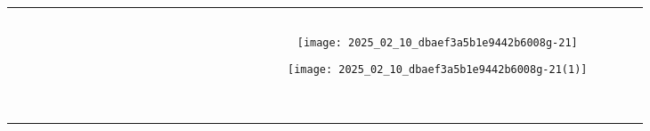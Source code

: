 \documentclass[10pt]{article}
\begin{document}
\begin{center}
\begin{tabular}{|c|c|c|c|c|c|c|c|c|c|c|c|c|c|c|c|c|c|c|c|c|c|c|c|c|c|c|}
\hline
 &  &  &  &  &  &  &  &  &  &  &  &  &  &  &  &  &  &  &  &  &  &  &  &  &  &  \\
\hline
 &  &  &  &  &  &  &  &  &  &  &  &  &  &  &  &  &  &  &  &  &  &  &  &  &  &  \\
\hline
 &  &  &  &  &  &  &  &  &  &  &  &  &  &  &  &  &  &  &  &  &  &  &  &  &  &  \\
\hline
 &  &  &  &  &  &  &  &  &  &  &  &  &  &  &  &  &  &  &  &  &  &  &  &  &  &  \\
\hline
 &  &  &  &  &  &  &  &  &  &  &  &  &  &  &  &  &  &  &  &  &  &  &  &  &  &  \\
\hline
 &  &  &  &  &  &  &  &  &  &  &  &  &  &  &  &  &  &  &  &  &  &  &  &  &  &  \\
\hline
 &  &  &  &  &  &  &  &  &  &  &  &  &  &  &  &  &  &  &  &  &  & \texttt{[image: 2025\_02\_10\_dbaef3a5b1e9442b6008g-21]}
 &  &  &  &  \\
\hline
 &  &  &  &  &  &  &  &  &  &  &  &  &  &  &  &  &  &  &  &  &  &  &  &  &  &  \\
\hline
 &  &  &  &  &  &  &  &  &  &  &  &  &  &  &  &  &  &  &  &  &  & \texttt{[image: 2025\_02\_10\_dbaef3a5b1e9442b6008g-21(1)]}
 &  &  &  &  \\
\hline
 &  &  &  &  &  &  &  &  &  &  &  &  &  &  &  &  &  &  &  &  &  &  &  &  &  &  \\
\hline
 &  &  &  &  &  &  &  &  &  &  &  &  &  &  &  &  &  &  &  &  &  &  &  &  &  &  \\
\hline
 &  &  &  &  &  &  &  &  &  &  &  &  &  &  &  &  &  &  &  &  &  &  &  &  &  &  \\
\hline
 &  &  &  &  &  &  &  &  &  &  &  &  &  &  &  &  &  &  &  &  &  &  &  &  &  &  \\
\hline
 &  &  &  &  &  &  &  &  &  &  &  &  &  &  &  &  &  &  &  &  &  &  &  &  &  &  \\
\hline
 &  &  &  &  &  &  &  &  &  &  &  &  &  &  &  &  &  &  &  &  &  &  &  &  &  &  \\
\hline
 &  &  &  &  &  &  &  &  &  &  &  &  &  &  &  &  &  &  &  &  &  &  &  &  &  &  \\
\hline
 &  &  &  &  &  &  &  &  &  &  &  &  &  &  &  &  &  &  &  &  &  &  &  &  &  &  \\
\hline
 &  &  &  &  &  &  &  &  &  &  &  &  &  &  &  &  &  &  &  &  &  &  &  &  &  &  \\

\end{tabular}
\end{center}
\end{document}
